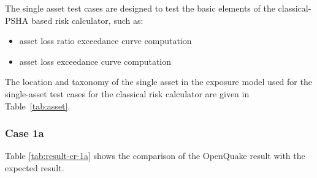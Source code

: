 The single asset test cases are designed to test the basic elements of the classical-PSHA based risk calculator, such as:

\begin{itemize}
\item asset loss ratio exceedance curve computation
\item asset loss exceedance curve computation
\end{itemize}

The location and taxonomy of the single asset in the exposure model used for the single-asset test cases for the classical risk calculator are given in Table~\ref{tab:asset}.

\subsubsection{Case 1a}


Table \ref{tab:result-cr-1a} shows the comparison of the OpenQuake result with the expected result.

